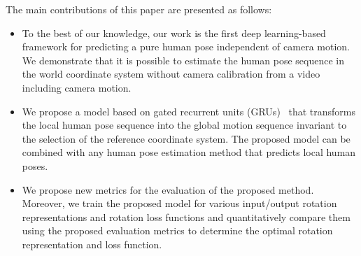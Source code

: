 \documentclass[10pt,twocolumn,letterpaper]{article}
\begin{document}




The main contributions of this paper are presented as follows:
\begin{itemize}
\item To the best of our knowledge, our work is the first deep learning-based framework for predicting a pure human pose independent of camera motion. We demonstrate that it is possible to estimate the human pose sequence in the world coordinate system without camera calibration from a video including camera motion.
\item We propose a model based on gated recurrent units (GRUs)~\cite{cho-etal-2014-learning} that transforms the local human pose sequence into the global motion sequence invariant to the selection of the reference coordinate system. The proposed model can be combined with any human pose estimation method that predicts local human poses.
\item We propose new metrics for the evaluation of the proposed method. Moreover, we train the proposed model for various input/output rotation representations and rotation loss functions and quantitatively compare them using the proposed evaluation metrics to determine the optimal rotation representation and loss function.
\end{itemize}
\end{document}
